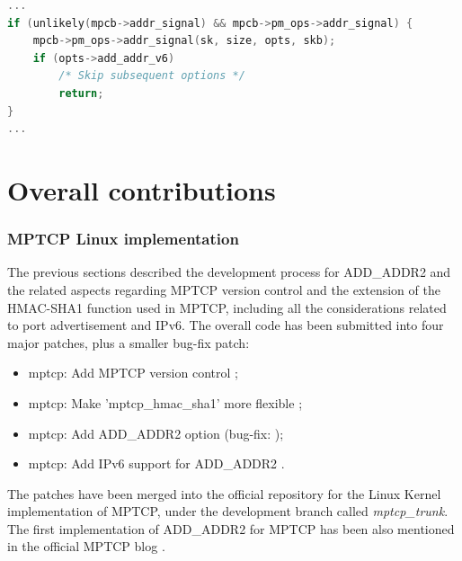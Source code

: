 \begin{lstlisting}[language=c, caption=\textit{In IPv6 case, MPTCP options are not added if ADD\_ADDR2 is present}, label=ipv6]
...
if (unlikely(mpcb->addr_signal) && mpcb->pm_ops->addr_signal) {
	mpcb->pm_ops->addr_signal(sk, size, opts, skb);
	if (opts->add_addr_v6)
		/* Skip subsequent options */
		return;
}
...
\end{lstlisting}


\section{Overall contributions}
\label{otherc}

\subsubsection{MPTCP Linux implementation}
The previous sections described the development process for ADD\_ADDR2 and the related aspects regarding MPTCP version control and the extension of the HMAC-SHA1 function used in MPTCP, including all the considerations related to port advertisement and IPv6. 
The overall code has been submitted into four major patches, plus a smaller bug-fix patch:

\begin{itemize}
  \item mptcp: Add MPTCP version control \cite{patch1};
  \item mptcp: Make 'mptcp\_hmac\_sha1' more flexible \cite{patch2};
  \item mptcp: Add ADD\_ADDR2 option \cite{patch3} (bug-fix: \cite{patch5});
  \item mptcp: Add IPv6 support for ADD\_ADDR2 \cite{patch4}.
\end{itemize}

The patches have been merged into the official repository for the Linux Kernel implementation of MPTCP, under the development branch called \textit{mptcp\_trunk}.
The first implementation of ADD\_ADDR2 for MPTCP has been also mentioned in the official MPTCP blog \cite{blog}.

